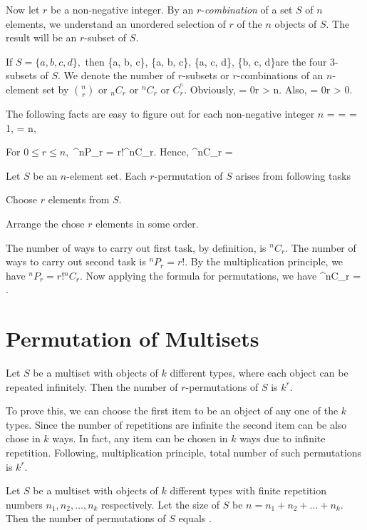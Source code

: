 Now let $r$ be a non-negative integer. By an $r$-{\it combination} of a set $S$ of $n$ elements, we understand an unordered
selection of $r$ of the $n$ objects of $S$. The result will be an $r$-subset of $S$.

If $S = \{a, b, c, d\},$ then \startformula \{a, b, c\}, \{a, b, c\}, \{a, c, d\}, \{b, c, d\}\stopformula are the four $3$-subsets of $S$. We denote
the number of $r$-subsets or $r$-combinations of an $n$-element set by $\binom{n}{r}$ or ${}_nC_r$ or
${}^nC_r$ or $C_r^^n$. Obviously,
\startformula {} = 0\;\;\;\;r > n.\stopformula
Also,
\startformula {} = 0\;\;\;\;r > 0.\stopformula

The following facts are easy to figure out for each non-negative integer $n$ \startformula {} =  =  = 1,  = n,\stopformula

For $0\leq r\leq n,$ \startformula {}^nP_r = r!{}^nC_r.\stopformula
Hence,
\startformula {}^nC_r = \stopformula

Let $S$ be an $n$-element set. Each $r$-permutation of $S$ arises from following tasks
\startitemize[n]
\item Choose $r$ elements from $S$.
\item Arrange the chose $r$ elements in some order.
\stopitemize

The number of ways to carry out first task, by definition, is ${}^nC_r$. The number of ways to carry out second task is ${}^nP_r =
r!$. By the multiplication principle, we have ${}^nP_r = r!{}^nC_r$. Now applying the formula for permutations, we have
\startformula {}^nC_r = .\stopformula

\section{Permutation of Multisets}
Let $S$ be a multiset with objects of $k$ different types, where each object can be repeated infinitely. Then the number of
$r$-permutations of $S$ is $k^r$.

To prove this, we can choose the first item to be an object of any one of the $k$ types. Since the number of repetitions are
infinite the second item can be also chose in $k$ ways. In fact, any item can be chosen in $k$ ways due to infinite
repetition. Following, multiplication principle, total number of such permutations is $k^r$.

Let $S$ be a multiset with objects of $k$ different types with finite repetition numbers $n_1, n_2, \ldots, n_k$ respectively. Let
the size of $S$ be $n = n_1 + n_2 + \ldots + n_k.$ Then the number of permutations of $S$ equals \startformula {}.\stopformula

